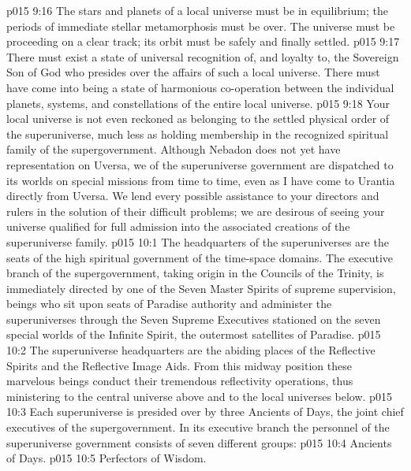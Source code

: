 \vs p015 9:16 \bibnobreakspace {} The stars and planets of a local universe must be in equilibrium; the periods of immediate stellar metamorphosis must be over. The universe must be proceeding on a clear track; its orbit must be safely and finally settled.
\vs p015 9:17 \pc {}\bibnobreakspace {} There must exist a state of universal recognition of, and loyalty to, the Sovereign Son of God who presides over the affairs of such a local universe. There must have come into being a state of harmonious co\hyp{}operation between the individual planets, systems, and constellations of the entire local universe.
\vs p015 9:18 \pc Your local universe is not even reckoned as belonging to the settled physical order of the superuniverse, much less as holding membership in the recognized spiritual family of the supergovernment. Although Nebadon does not yet have representation on Uversa, we of the superuniverse government are dispatched to its worlds on special missions from time to time, even as I have come to Urantia directly from Uversa. We lend every possible assistance to your directors and rulers in the solution of their difficult problems; we are desirous of seeing your universe qualified for full admission into the associated creations of the superuniverse family.
\vs p015 10:1 The headquarters of the superuniverses are the seats of the high spiritual government of the time\hyp{}space domains. The executive branch of the supergovernment, taking origin in the Councils of the Trinity, is immediately directed by one of the Seven Master Spirits of supreme supervision, beings who sit upon seats of Paradise authority and administer the superuniverses through the Seven Supreme Executives stationed on the seven special worlds of the Infinite Spirit, the outermost satellites of Paradise.
\vs p015 10:2 The superuniverse headquarters are the abiding places of the Reflective Spirits and the Reflective Image Aids. From this midway position these marvelous beings conduct their tremendous reflectivity operations, thus ministering to the central universe above and to the local universes below.
\vs p015 10:3 \pc Each superuniverse is presided over by three Ancients of Days, the joint chief executives of the supergovernment. In its executive branch the personnel of the superuniverse government consists of seven different groups:
\vs p015 10:4 \bibnobreakspace Ancients of Days.
\vs p015 10:5 \bibnobreakspace Perfectors of Wisdom.
